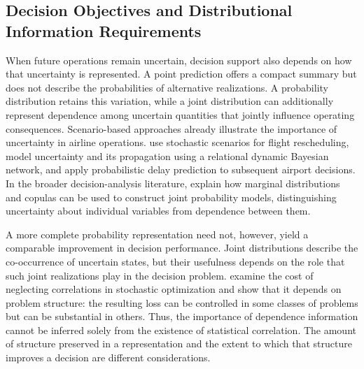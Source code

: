 \subsection{Decision Objectives and Distributional Information Requirements}
\label{subsec:rw_decision_value}

When future operations remain uncertain, decision support also depends on how that uncertainty is represented. A point prediction offers a compact summary but does not describe the probabilities of alternative realizations. A probability distribution retains this variation, while a joint distribution can additionally represent dependence among uncertain quantities that jointly influence operating consequences. Scenario-based approaches already illustrate the importance of uncertainty in airline operations. \citet{wooScenarioBasedStochastic2021} use stochastic scenarios for flight rescheduling, \citet{ogunsinaRelationalDynamicBayesian2022} model uncertainty and its propagation using a relational dynamic Bayesian network, and \citet{zoutendijkProbabilisticFlightDelay2021} apply probabilistic delay prediction to subsequent airport decisions. In the broader decision-analysis literature, \citet{clemenReillyCorrelationsCopulas1999} explain how marginal distributions and copulas can be used to construct joint probability models, distinguishing uncertainty about individual variables from dependence between them.

A more complete probability representation need not, however, yield a comparable improvement in decision performance. Joint distributions describe the co-occurrence of uncertain states, but their usefulness depends on the role that such joint realizations play in the decision problem. \citet{agrawalPriceCorrelations2012} examine the cost of neglecting correlations in stochastic optimization and show that it depends on problem structure: the resulting loss can be controlled in some classes of problems but can be substantial in others. Thus, the importance of dependence information cannot be inferred solely from the existence of statistical correlation. The amount of structure preserved in a representation and the extent to which that structure improves a decision are different considerations.

